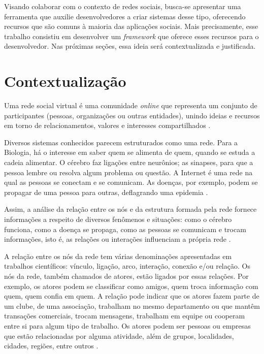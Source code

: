 Visando colaborar com o contexto de redes sociais, busca-se apresentar uma ferramenta que auxilie desenvolvedores a criar sistemas desse tipo, oferecendo recursos que são comuns à maioria das aplicações sociais. Mais precisamente, esse trabalho consistiu em desenvolver um \textit{framework} que oferece esses recursos para o desenvolvedor. Nas próximas seções, essa ideia será contextualizada e justificada.

\section{Contextualização}

Uma rede social virtual é uma comunidade \textit{online} que representa um conjunto de participantes (pessoas, organizações ou outras entidades), unindo ideias e recursos em torno de relacionamentos, valores e interesses compartilhados \cite{Marteleto:2001}.

Diversos sistemas conhecidos parecem estruturados como uma rede. Para a Biologia, há o interesse em saber quem se alimenta de quem, quando se estuda a cadeia alimentar. O cérebro faz ligações entre neurônios; as sinapses, para que a pessoa lembre ou resolva algum problema ou questão. A Internet é uma rede na qual as pessoas se conectam e se comunicam. As doenças, por exemplo, podem se propagar de uma pessoa para outras, deflagrando uma epidemia \cite{Goular:2014}.

Assim, a análise da relação entre os nós e da estrutura formada pela rede fornece informações a respeito de diversos fenômenos e situações: como o cérebro funciona, como a doença se propaga, como as pessoas se comunicam e trocam informações, isto é, as relações ou interações influenciam a própria rede \cite{Goular:2014}.

A relação entre os nós da rede tem várias denominações apresentadas em trabalhos científicos: vínculo, ligação, arco, interação, conexão e/ou relação. Os nós da rede, também chamados de atores, estão ligados por essas relações. Por exemplo, os atores podem se classificar como amigos, quem troca informação com quem, quem confia em quem. A relação pode indicar que os atores fazem parte de um clube, de uma associação, trabalham no mesmo departamento ou que mantêm transações comerciais, trocam mensagens, trabalham em equipe ou cooperam entre si para algum tipo de trabalho. Os atores podem ser pessoas ou empresas que estão relacionadas por alguma atividade, além de grupos, localidades, cidades, regiões, entre outros \cite{Hanneman:Riddle:2005}.

